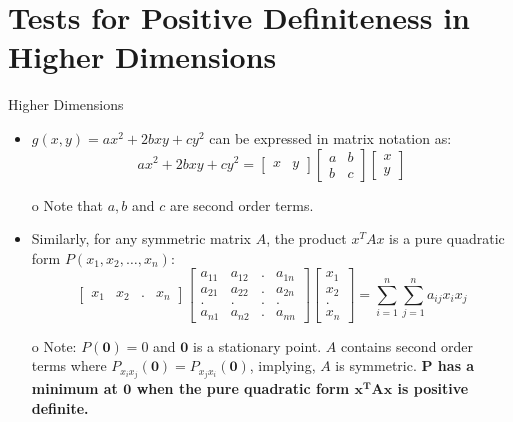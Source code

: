 \documentclass{beamer}
\begin{document}

\section{Tests for Positive Definiteness in Higher Dimensions}

\begin{frame}{Higher Dimensions}{}
\begin{itemize}
    \item {$g(x,y) = ax^2 + 2bxy + cy^2$ can be expressed in matrix notation as:
        \begin{equation*}
            ax^2 + 2bxy + cy^2 = \begin{bmatrix}x&y\end{bmatrix}\begin{bmatrix}a&b\\b&c\end{bmatrix}\begin{bmatrix}x\\y\end{bmatrix}
        \end{equation*}
    }
    \item[o] Note that $a,b$ and $c$ are second order terms.
    \item {Similarly, for any symmetric matrix $A$, the product $x^TAx$ is a pure quadratic form $P(x_1,x_2,\ldots,x_n)$:
        \begin{equation*}
            \begin{bmatrix}x_1&x_2&.&x_n\end{bmatrix}\begin{bmatrix}a_{11}&a_{12}&.&a_{1n}\\a_{21}&a_{22}&.&a_{2n}\\.&.&.&.\\a_{n1}&a_{n2}&.&a_{nn}\end{bmatrix}\begin{bmatrix}x_1\\x_2\\.\\x_n\end{bmatrix} = \sum_{i=1}^{n}\sum_{j=1}^{n}a_{ij}x_ix_j
        \end{equation*}
    }
    \item[o] Note: $P(\mathbf{0}) = 0$ and $\mathbf{0}$ is a stationary point. $A$ contains second order terms where $P_{x_ix_j}(\mathbf{0}) = P_{x_jx_i}(\mathbf{0})$, implying, $A$ is symmetric. \textbf{$\mathbf{P}$ has a minimum at $\mathbf{0}$ when the pure quadratic form $\mathbf{x^TAx}$ is positive definite.}
\end{itemize}
\end{frame}
\end{document}
